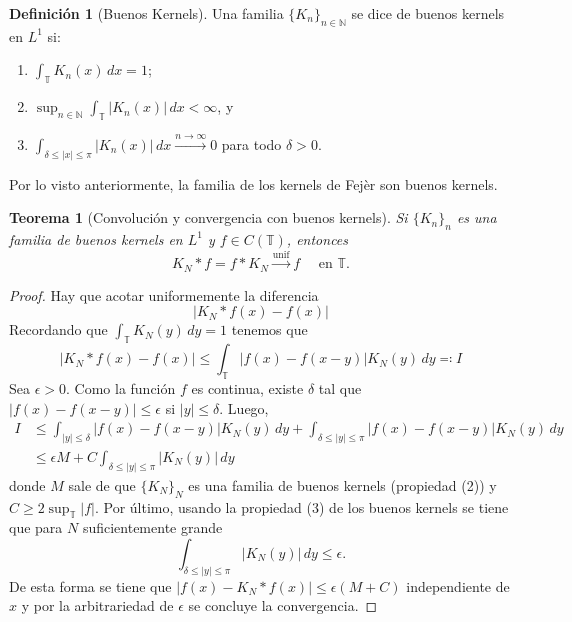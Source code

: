 \documentclass{article}
\newtheorem{Teorema}{Teorema}
\theoremstyle{plain}
\theoremstyle{definition}
\newtheorem{Definicion}{Definición}
\newcommand{\T}{\mathbb{T}}
\newcommand{\N}{\mathbb{N}}
\newcommand{\abs}[1]{\lvert #1 \rvert}
\begin{document}
\begin{Definicion}[Buenos Kernels]
  Una familia \(\lbrace K_n \rbrace_{n\in \N}\) se dice de buenos kernels en \(L^1\) si:
  \begin{enumerate}
    \item \(\int_{\T} K_n(x) \,dx = 1\);
    \item \(\sup_{n\in\N} \int_{\T} \abs{K_n(x)}\, dx < \infty\), y
    \item \(\int_{\delta \le \abs{x} \le \pi} \abs{K_n(x)} \, dx \xrightarrow{n\to\infty} 0\) 
    para todo \(\delta > 0\).
  \end{enumerate}
\end{Definicion}

Por lo visto anteriormente, la familia de los kernels de Fejèr son buenos kernels.

\begin{Teorema}[Convolución y convergencia con buenos kernels]
  Si \(\lbrace K_n \rbrace_n\) es una familia de buenos kernels en \(L^1\) y 
  \(f\in C(\T)\), entonces
  \begin{displaymath}
    K_N\ast f = f \ast K_N \xrightarrow{\text{unif}} f
    \quad\text{ en } \T. 
  \end{displaymath}
\end{Teorema}
\begin{proof}
  Hay que acotar uniformemente la diferencia
  \begin{displaymath}
    \abs{ K_N\ast f(x) - f(x)}
  \end{displaymath}
  Recordando que \(\int_{\T} K_N(y) \, dy = 1\) tenemos que
  \begin{displaymath}
    \abs{ K_N \ast f(x) - f(x)}
    \le
    \int_{\T} \abs{f(x) - f(x-y)} K_N(y)\, dy
    \eqqcolon I
  \end{displaymath}
  Sea \(\epsilon > 0\).
  Como la función \(f\) es continua, existe \(\delta\) tal que \(\abs{f(x) - f(x-y)} \le \epsilon\)
  si \(\abs{y} \le \delta\). Luego,
  \begin{align*}
    I 
    &\le 
    \int_{\abs{y} \le \delta}
      \abs{ f(x) - f(x-y) } K_N(y)\, dy
    +
    \int_{\delta \le \abs{y} \le \pi}
      \abs{ f(x) - f(x-y) } K_N(y)\, dy
    \\&\le
    \epsilon M 
    + 
    C
    \int_{\delta \le \abs{y} \le \pi} \abs{K_N(y)}\, dy 
  \end{align*}
  donde \(M\) sale de que \(\lbrace K_N\rbrace_{N}\) es una familia de buenos kernels
  (propiedad (2)) y \(C \ge 2\sup_{\T} \abs{f}\). Por último, usando la propiedad
  (3) de los buenos kernels se tiene que para \(N\) suficientemente grande
  \begin{displaymath}
    \int_{\delta \le \abs{y} \le \pi} \abs{K_N(y)}\, dy 
    \le \epsilon.
  \end{displaymath}
  De esta forma se tiene que \(\abs{ f(x) - K_N \ast f(x) } \le \epsilon (M + C)\) 
  independiente de \(x\) y por la arbitrariedad de \(\epsilon\) se concluye la convergencia. 
\end{proof}
\end{document}
